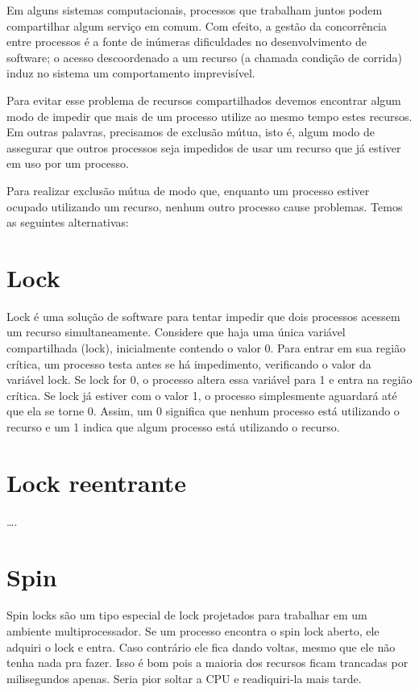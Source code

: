 
Em alguns sistemas computacionais, processos que trabalham juntos podem compartilhar algum serviço em comum. Com efeito, a gestão da concorrência entre processos é a fonte de inúmeras dificuldades no desenvolvimento de software; o acesso descoordenado a um recurso (a chamada condição de corrida) induz no sistema um comportamento imprevisível.

Para evitar esse problema de recursos compartilhados devemos encontrar algum modo de impedir que mais de um processo utilize ao mesmo tempo estes recursos. Em outras palavras, precisamos de exclusão mútua, isto é, algum modo de assegurar que outros processos seja impedidos de usar um recurso que já estiver em uso por um processo.

Para realizar exclusão mútua de modo que, enquanto um processo estiver ocupado utilizando um recurso, nenhum outro processo cause problemas. Temos as seguintes alternativas:

\section{Lock}

Lock é uma solução de software para tentar impedir que dois processos acessem um recurso simultaneamente. Considere que haja uma única variável compartilhada (lock), inicialmente contendo o valor 0. Para entrar em sua região crítica, um processo testa antes se há impedimento, verificando o valor da variável lock. Se lock for 0, o processo altera essa variável para 1 e entra na região crítica. Se lock já estiver com o valor 1, o processo simplesmente aguardará até que ela se torne 0. Assim, um 0 significa que nenhum processo está utilizando o recurso e um 1 indica que algum processo está utilizando o recurso. 


\section{Lock reentrante}
….

\section{Spin}

Spin locks são um tipo especial de lock projetados para trabalhar em um ambiente multiprocessador. Se um processo encontra o spin lock aberto, ele adquiri o lock e entra. Caso contrário ele fica dando voltas, mesmo que ele não tenha nada pra fazer. Isso é bom pois a maioria dos recursos ficam trancadas por milisegundos apenas. Seria pior soltar a CPU e readiquiri-la mais tarde.

